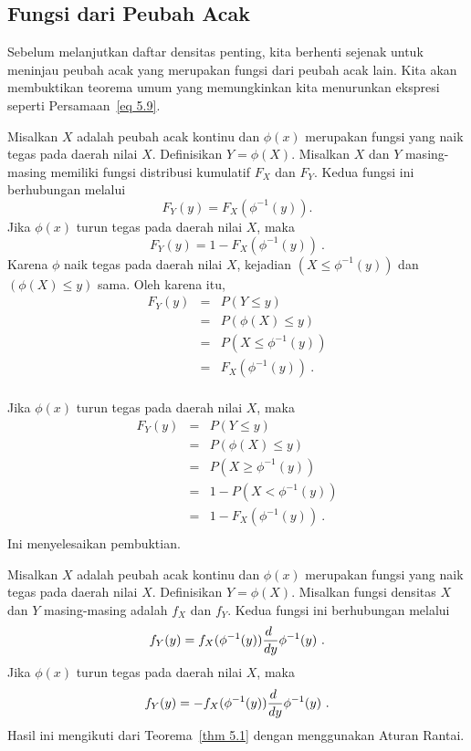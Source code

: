 \subsection*{Fungsi dari Peubah Acak} 
Sebelum melanjutkan daftar densitas penting, kita berhenti sejenak untuk meninjau peubah acak yang
merupakan fungsi dari peubah acak lain.  Kita akan membuktikan teorema umum yang memungkinkan kita
menurunkan ekspresi seperti Persamaan~\ref{eq 5.9}.
\par
\begin{theorem}\label{thm 5.1} Misalkan $X$ adalah peubah acak kontinu dan $\phi(x)$
merupakan fungsi yang naik tegas pada daerah nilai $X$.  Definisikan $Y = \phi(X)$.
Misalkan $X$ dan $Y$ masing-masing memiliki fungsi distribusi kumulatif $F_X$ dan
$F_Y$.  Kedua fungsi ini berhubungan melalui
$$ F_Y(y) = F_X(\phi^{-1}(y)).
$$ Jika $\phi(x)$ turun tegas pada daerah nilai $X$, maka
$$F_Y(y) = 1 - F_X(\phi^{-1}(y))\ .$$
\proof Karena $\phi$ naik tegas pada daerah nilai $X$, kejadian
$(X \le \phi^{-1}(y))$ dan $(\phi(X) \le y)$ sama.  Oleh karena itu,
\begin{eqnarray*} F_Y(y) & = & P(Y \le y) \\ & = & P(\phi(X) \le y) \\ & = & P(X \le
\phi^{-1}(y)) \\ & = & F_X(\phi^{-1}(y))\ . \\
\end{eqnarray*}
\par Jika $\phi(x)$ turun tegas pada daerah nilai $X$, maka
\begin{eqnarray*} F_Y(y) & = & P(Y \leq y) \\
       & = & P(\phi(X) \leq y) \\
       & = & P(X \geq \phi^{-1}(y)) \\
       & = & 1 - P(X < \phi^{-1}(y)) \\
       & = & 1 - F_X(\phi^{-1}(y))\ . \\
\end{eqnarray*} Ini menyelesaikan pembuktian.
\end{theorem}
\begin{corollary}\label{cor 5.1} Misalkan $X$ adalah peubah acak kontinu dan $\phi(x)$
merupakan fungsi yang naik tegas pada daerah nilai $X$.  Definisikan $Y = \phi(X)$.
Misalkan fungsi densitas $X$ dan $Y$ masing-masing adalah $f_X$ dan $f_Y$.  Kedua
fungsi ini berhubungan melalui
$$f_Y(y) = f_X(\phi^{-1}(y)){{d\ }\over{dy}}\phi^{-1}(y)\ .$$  Jika $\phi(x)$
turun tegas pada daerah nilai $X$, maka
$$f_Y(y) = -f_X(\phi^{-1}(y)){{d\ }\over{dy}}\phi^{-1}(y)\ .$$
\proof Hasil ini mengikuti dari Teorema~\ref{thm 5.1} dengan menggunakan Aturan
Rantai.
\end{corollary} 
